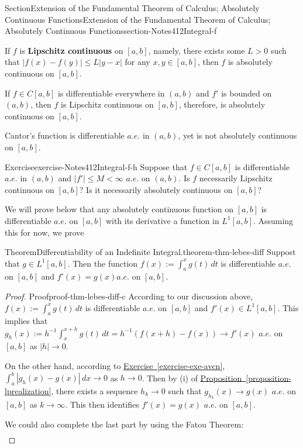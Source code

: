 \documentclass[oneside,10pt,]{article}
\newcommand{\xreffont}{\relax}
\newcommand{\terminology}[1]{\textbf{#1}}
\numberwithin{equation}{section}
\begin{document}
\begin{sectionptx}{Section}{Extension of the Fundamental Theorem of Calculus; Absolutely Continuous Functions}{}{Extension of the Fundamental Theorem of Calculus; Absolutely Continuous Functions}{}{}{section-Notes412Integral-f}
\par
If \(f\) is \terminology{Lipschitz continuous} on \([a, b]\), namely, there exists some \(L > 0\) such that \(|f(x)-f(y)|\le L |y-x|\) for any \(x, y\in [a, b]\), then \(f\) is absolutely continuous on \([a, b]\).%
\par
If \(f\in C[a, b]\) is differentiable everywhere in \((a, b)\) and \(f'\) is bounded on \((a, b)\), then \(f\) is Lipschitz continuous on \([a, b]\), therefore, is absolutely continuous on \([a, b]\).%
\par
Cantor's function is differentiable \(a.e.\) in \((a, b)\), yet is not absolutely continuous on \([a, b]\).%
\begin{inlineexercise}{Exercise}{}{exercise-Notes412Integral-f-h}%
Suppose that  \(f\in C[a, b]\) is differentiable \(a.e.\) in \((a, b)\) and \(|f'|\le M < \infty\) \(a.e.\) on \((a, b)\). Is \(f\) necessarily Lipschitz continuous on \([a, b]\)? Is it necessarily absolutely continuous on \([a, b]\)?%
\end{inlineexercise}%
We will prove below that any absolutely continuous function on \([a, b]\) is differentiable \(a.e.\) on \([a, b]\) with its derivative a function in \(L^{1}[a, b]\). Assuming this for now, we prove%
\begin{theorem}{Theorem}{Differentiability of an Indefinite Integral.}{}{theorem-thm-lebes-diff}%
Suppost that \(g\in L^{1}[a, b]\). Then the function \(f(x) :=\int_{a}^{x} g(t)\, dt\) is differentiable \(a.e.\) on \([a, b]\) and \(f'(x)=g(x)\)\(a.e.\) on \([a, b]\).\end{theorem}
\begin{proof}{Proof}{}{proof-thm-lebes-diff-c}
According to our discussion above, \(f(x) :=\int_{a}^{x} g(t)\, dt\) is differentiable \(a.e.\) on \([a, b]\) and \(f'(x)\in L^{1}[a, b]\). This implies that \(g_{h}(x) := h^{-1}\int_{x}^{x+h} g(t)\, dt =h^{-1}(f(x+h)-f(x)) \to f'(x)\) \(a.e.\) on \([a, b]\) as \(|h|\to 0\).%
\par
On the other hand, according to \hyperref[exercise-exe-avcn]{Exercise~{\xreffont\ref{exercise-exe-avcn}}}, \(\int_{a}^{b}|g_{h}(x)-g(x)|\, dx\to 0\) as \(h\to 0\). Then by (i) of \hyperref[proposition-lprealization]{Proposition~{\xreffont\ref{proposition-lprealization}}},  there exists a sequence \(h_{k}\to 0\) such that \(g_{h_{k}}(x)\to g(x)\) \(a.e.\) on \([a, b]\) as \(k\to \infty\). This then identifies \(f'(x)=g(x)\) \(a.e.\) on \([a, b]\).%
\par
We could also complete the last part by using the Fatou Theorem:%
\begin{align*}

\end{align*}
\end{proof}
\end{sectionptx}
\end{document}
